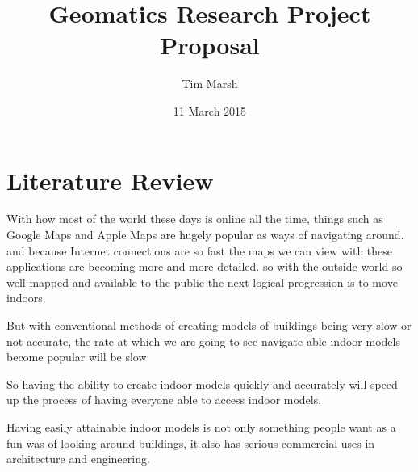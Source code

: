 \documentclass[11pt,a4paper,final]{article}
\author{Tim Marsh}
\title{Geomatics Research Project Proposal}
\date{11 March 2015}
\begin{document}
	
	\pagebreak
	\tableofcontents
	\pagebreak
	
	\section{Literature Review}
	
	With how most of the world these days is online all the time, things such as Google Maps and Apple Maps are hugely popular as ways of navigating around. and because Internet connections are so fast the maps we can view with these applications are becoming more and more detailed. so with the outside world so well mapped and available to the public the next logical progression is to move indoors.
	
	But with conventional methods of creating models of buildings being very slow or not accurate, the rate at which we are going to see navigate-able indoor models become popular will be slow.
	
	So having the ability to create indoor models quickly and accurately will speed up the process of having everyone able to access indoor models.
	
	Having easily attainable indoor models is not only something people want as a fun was of looking around buildings, it also has serious commercial uses in architecture and engineering.
	
	\setcounter{page}{1}
	

	
\end{document}
